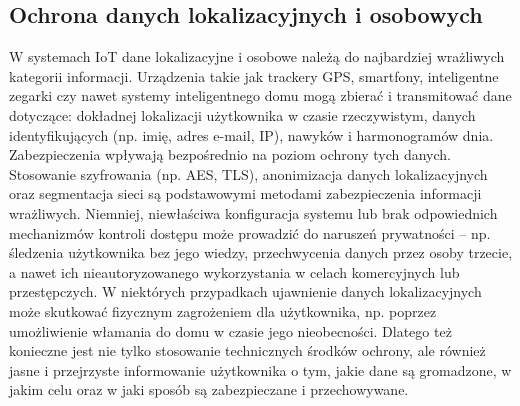 \subsection{Ochrona danych lokalizacyjnych i osobowych}
W systemach IoT dane lokalizacyjne i osobowe należą do najbardziej wrażliwych kategorii informacji. Urządzenia takie jak trackery GPS, smartfony, inteligentne zegarki czy nawet systemy inteligentnego domu mogą zbierać i transmitować dane dotyczące: dokładnej lokalizacji użytkownika w czasie rzeczywistym, danych identyfikujących (np. imię, adres e-mail, IP), nawyków i harmonogramów dnia.
Zabezpieczenia wpływają bezpośrednio na poziom ochrony tych danych. Stosowanie szyfrowania (np. AES, TLS), anonimizacja danych lokalizacyjnych oraz segmentacja sieci są podstawowymi metodami zabezpieczenia informacji wrażliwych. Niemniej, niewłaściwa konfiguracja systemu lub brak odpowiednich mechanizmów kontroli dostępu może prowadzić do naruszeń prywatności – np. śledzenia użytkownika bez jego wiedzy, przechwycenia danych przez osoby trzecie, a nawet ich nieautoryzowanego wykorzystania w celach komercyjnych lub przestępczych. W niektórych przypadkach ujawnienie danych lokalizacyjnych może skutkować fizycznym zagrożeniem dla użytkownika, np. poprzez umożliwienie włamania do domu w czasie jego nieobecności. Dlatego też konieczne jest nie tylko stosowanie technicznych środków ochrony, ale również jasne i przejrzyste informowanie użytkownika o tym, jakie dane są gromadzone, w jakim celu oraz w jaki sposób są zabezpieczane i przechowywane.

